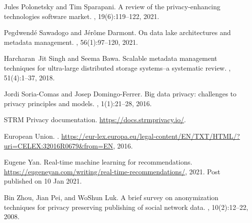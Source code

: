 \documentclass[11pt]{article} %
\begin{document}
\begin{thebibliography}{10}
\begin{small}
Jules Polonetsky and Tim Sparapani.
\newblock A review of the privacy-enhancing technologies software market.
, 19(6):119--122, 2021.

Pegdwend{\'e} Sawadogo and J{\'e}r{\^o}me Darmont.
\newblock On data lake architectures and metadata management.
, 56(1):97--120,
  2021.

Harcharan~Jit Singh and Seema Bawa.
\newblock Scalable metadata management techniques for ultra-large distributed
  storage systems--a systematic review.
, 51(4):1--37, 2018.

Jordi Soria-Comas and Josep Domingo-Ferrer.
\newblock Big data privacy: challenges to privacy principles and models.
, 1(1):21--28, 2016.

{STRM Privacy documentation}.
\newblock \url{https://docs.strmprivacy.io/}.

European Union.
.
\newblock
  \url{https://eur-lex.europa.eu/legal-content/EN/TXT/HTML/?uri=CELEX:32016R0679&from=EN},
  2016.

Eugene Yan.
\newblock Real-time machine learning for recommendations.
\newblock \url{https://eugeneyan.com/writing/real-time-recommendations/}, 2021.
\newblock Post published on 10 Jan 2021.

Bin Zhou, Jian Pei, and WoShun Luk.
\newblock A brief survey on anonymization techniques for privacy preserving
  publishing of social network data.
, 10(2):12--22, 2008.


\end{small}
\end{thebibliography}
\end{document}
